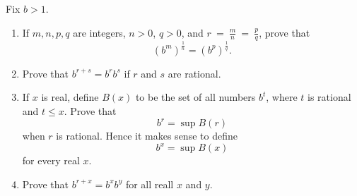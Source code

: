 \begin{exercise}
	Fix $b > 1$.
	\renewcommand{\labelenumi}{(\alph{enumi})}
	\begin{enumerate}
		\item If $m,n,p,q$ are integers, $n > 0$, $q > 0$, and $r~=~\frac{m}{n}~=~\frac{p}{q}$, prove that
		\begin{equation*}
		\left( b^m \right)^{\frac{1}{n}} = \left( b^p \right)^{\frac{1}{q}}.
		\end{equation*}
		\item Prove that $b^{r + s} = b^rb^s$ if $r$ and $s$ are rational.
		\item If $x$ is real, define $B \left( x \right)$ to be the set of all numbers $b^t$, where $t$ is rational and $t \leq x$. Prove that
		\begin{equation*}
		b^r = \sup B \left( r \right)
		\end{equation*}
		when $r$ is rational. Hence it makes sense to define
		\begin{equation*}
		b^x = \sup B \left( x \right)
		\end{equation*}
		for every real $x$.
		\item Prove that $b^{r + x} = b^xb^y$ for all reall $x$ and $y$.
	\end{enumerate}
\end{exercise}

